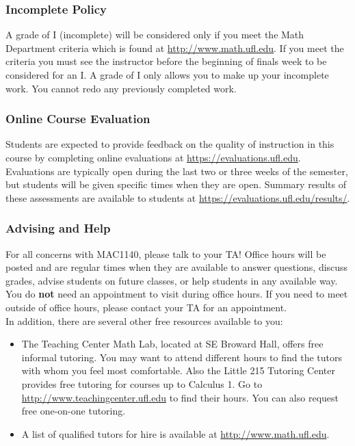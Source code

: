 \documentclass{ximeraXloud}
\begin{document}
\subsubsection*{Incomplete Policy}
    A grade of I (incomplete) will be considered only if you meet the Math Department criteria which is found at \url{http://www.math.ufl.edu}.  If you meet the criteria you must see the instructor before the beginning of finals week to be considered for an I.  A grade of I only allows you to make up your incomplete work. You cannot redo any previously completed work.


\subsubsection*{Online Course Evaluation}
    Students are expected to provide feedback on the quality of instruction in this course by completing online evaluations at \url{https://evaluations.ufl.edu}. Evaluations are typically open during the last two or three weeks of the semester, but students will be given specific times when they are open. Summary results of these assessments are available to students at \url{https://evaluations.ufl.edu/results/}.

\subsubsection*{Advising and Help}  %
    For all concerns with MAC1140, please talk to your TA!  Office hours will be posted and are regular times when they are available to answer questions, discuss grades, advise students on future classes, or help students in any available way. You do \textbf{not} need an appointment to visit during office hours. If you need to meet outside of office hours, please contact your TA for an appointment. \\


    \noindent In addition, there are several other free resources available to you:
    \begin{itemize}
        \item The Teaching Center Math Lab, located at SE Broward Hall, offers free informal tutoring. You may want to attend different hours to find the tutors with whom you feel most comfortable.  Also the Little 215 Tutoring Center provides free tutoring for courses up to Calculus 1.  Go to \url{http://www.teachingcenter.ufl.edu} to find their hours. You can also request free one-on-one tutoring.
    
        \item A list of qualified tutors for hire is available at \url{http://www.math.ufl.edu}.
    \end{itemize}
\end{document}
